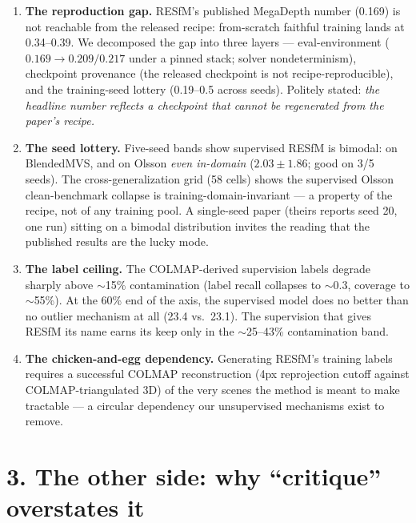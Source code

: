 \documentclass[11pt]{article}
\begin{document}
\begin{enumerate}[leftmargin=1.6em,itemsep=6pt]
\item \textbf{The reproduction gap.} RESfM's published MegaDepth number (0.169) is not
reachable from the released recipe: from-scratch faithful training lands at 0.34--0.39. We
decomposed the gap into three layers --- eval-environment ($0.169\rightarrow0.209/0.217$ under
a pinned stack; solver nondeterminism), checkpoint provenance (the released checkpoint is not
recipe-reproducible), and the training-seed lottery (0.19--0.5 across seeds). Politely stated:
\emph{the headline number reflects a checkpoint that cannot be regenerated from the paper's
recipe.}

\item \textbf{The seed lottery.} Five-seed bands show supervised RESfM is bimodal: on
BlendedMVS, and on Olsson \emph{even in-domain} ($2.03\pm1.86$; good on 3/5 seeds). The
cross-generalization grid (58 cells) shows the supervised Olsson clean-benchmark collapse is
training-domain-invariant --- a property of the recipe, not of any training pool. A single-seed
paper (theirs reports seed 20, one run) sitting on a bimodal distribution invites the reading
that the published results are the lucky mode.

\item \textbf{The label ceiling.} The COLMAP-derived supervision labels degrade sharply above
$\sim$15\% contamination (label recall collapses to $\sim$0.3, coverage to $\sim$55\%). At the
60\% end of the axis, the supervised model does no better than no outlier mechanism at all
(23.4 vs.\ 23.1). The supervision that gives RESfM its name earns its keep only in the
$\sim$25--43\% contamination band.

\item \textbf{The chicken-and-egg dependency.} Generating RESfM's training labels requires a
successful COLMAP reconstruction (4px reprojection cutoff against COLMAP-triangulated 3D) of
the very scenes the method is meant to make tractable --- a circular dependency our
unsupervised mechanisms exist to remove.
\end{enumerate}

\section*{3. The other side: why ``critique'' overstates it}
\end{document}
